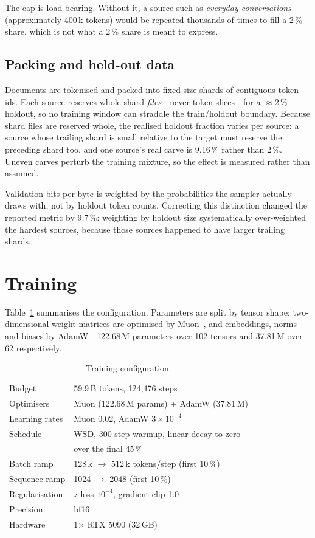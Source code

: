 \documentclass[conference]{IEEEtran}
\begin{document}
The cap is load-bearing. Without it, a source such as
\emph{everyday-conversations} (approximately 400\,k tokens) would be repeated
thousands of times to fill a 2\,\% share, which is not what a 2\,\% share is
meant to express.

\subsection{Packing and held-out data}

Documents are tokenised and packed into fixed-size shards of contiguous token
ids. Each source reserves whole shard \emph{files}---never token slices---for a
$\approx$2\,\% holdout, so no training window can straddle the train/holdout
boundary. Because shard files are reserved whole, the realised holdout fraction
varies per source: a source whose trailing shard is small relative to the target
must reserve the preceding shard too, and one source's real carve is 9.16\,\%
rather than 2\,\%. Uneven carves perturb the training mixture, so the effect is
measured rather than assumed.

Validation bits-per-byte is weighted by the probabilities the sampler actually
draws with, not by holdout token counts. Correcting this distinction changed the
reported metric by 9.7\,\%: weighting by holdout size systematically
over-weighted the hardest sources, because those sources happened to have larger
trailing shards.

\section{Training}

Table~\ref{tab:training} summarises the configuration. Parameters are split by
tensor shape: two-dimensional weight matrices are optimised by Muon~\cite{muon},
and embeddings, norms and biases by AdamW---122.68\,M parameters over 102
tensors and 37.81\,M over 62 respectively.

\begin{table}[t]
\caption{Training configuration.}
\label{tab:training}
\centering
\begin{tabular}{@{}ll@{}}
\toprule
Budget      & 59.9\,B tokens, 124{,}476 steps \\
Optimisers  & Muon (122.68\,M params) + AdamW (37.81\,M) \\
Learning rates & Muon 0.02, AdamW $3\times10^{-4}$ \\
Schedule    & WSD, 300-step warmup, linear decay to zero \\
            & over the final 45\,\% \\
Batch ramp  & 128\,k $\rightarrow$ 512\,k tokens/step (first 10\,\%) \\
Sequence ramp & 1024 $\rightarrow$ 2048 (first 10\,\%) \\
Regularisation & $z$-loss $10^{-4}$, gradient clip 1.0 \\
Precision   & bf16 \\
Hardware    & 1$\times$ RTX 5090 (32\,GB) \\
\bottomrule
\end{tabular}
\end{table}
\end{document}

